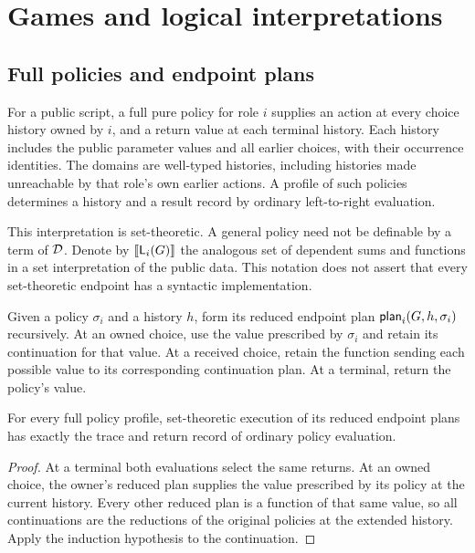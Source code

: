 \section{Games and logical interpretations}
\label{sec:interpretations}

\subsection{Full policies and endpoint plans}
\label{sec:policies}

For a public script, a full pure policy for role $i$ supplies an action at
every choice history owned by $i$, and a return value at each terminal
history. Each history includes the public parameter values and all earlier
choices, with their occurrence identities. The domains are well-typed
histories, including histories made unreachable by that role's own earlier
actions. A profile of such policies determines a history and a result record
by ordinary left-to-right evaluation.

This interpretation is set-theoretic. A general policy need not be definable
by a term of $\mathcal D$. Denote by $\llbracket\mathsf L_{i}(G)\rrbracket$ the analogous
set of dependent sums and functions in a set interpretation of the public
data. This notation does not assert that every set-theoretic endpoint has a
syntactic implementation.

Given a policy $\sigma_i$ and a history $h$, form its reduced endpoint plan
$\mathsf{plan}_i(G,h,\sigma_i)$ recursively. At an owned choice, use the value
prescribed by $\sigma_i$ and retain its continuation for that value. At a
received choice, retain the function sending each possible value to its
corresponding continuation plan. At a terminal, return the policy's value.

\begin{theorem}
\label{thm:adequacy}
For every full policy profile, set-theoretic execution of its reduced
endpoint plans has exactly the trace and return record of ordinary policy
evaluation.
\end{theorem}
\begin{proof}
At a terminal both evaluations select the same returns. At an owned choice,
the owner's reduced plan supplies the value prescribed by its policy at
the current history. Every other reduced plan is a function of that same
value, so all continuations are the reductions of the original policies at
the extended history. Apply the induction hypothesis to the continuation.
\end{proof}

